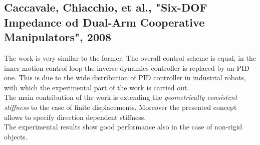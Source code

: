 \documentclass[conference]{IEEEtran}
\begin{document}
\subsection{Caccavale, Chiacchio, et al., "Six-DOF Impedance od Dual-Arm Cooperative Manipulators", 2008}
The work is very similar to the former. The overall control scheme is equal, in the inner motion control loop the inverse dynamics controller is replaced by an PID one. This is due to the wide distribution of PID controller in industrial robots, with which the experimental part of the work is carried out.\\
The main contribution of the work is extending the \emph{geometrically consistent stiffness} to the case of finite displacements. Moreover the presented concept allows to specify direction dependent stiffness.\\
The experimental results show good performance also in the case of non-rigid objects.

\end{document}

